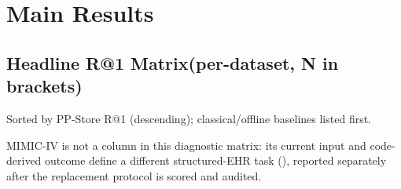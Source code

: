 \section{Main Results}\label{sec-6}

\subsection{Headline R@1 Matrix(per-dataset, N in brackets)}\label{sec-6-1}

Sorted by PP-Store R@1 (descending); classical/offline baselines listed first.

MIMIC-IV is not a column in this diagnostic matrix: its current input and
code-derived outcome define a different structured-EHR task (), reported
separately after the replacement protocol is scored and audited.


